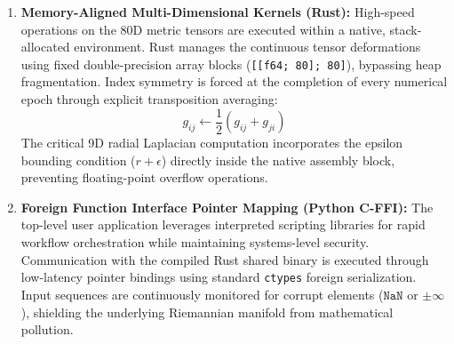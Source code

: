 \begin{enumerate}
    \item \textbf{Memory-Aligned Multi-Dimensional Kernels (Rust):} High-speed operations on the 80D metric tensors are executed within a native, stack-allocated environment. Rust manages the continuous tensor deformations using fixed double-precision array blocks (\texttt{[[f64; 80]; 80]}), bypassing heap fragmentation. Index symmetry is forced at the completion of every numerical epoch through explicit transposition averaging:
    \[
    g_{ij} \leftarrow \frac{1}{2}\left(g_{ij} + g_{ji}\right)
    \]
    The critical 9D radial Laplacian computation incorporates the epsilon bounding condition ($r + \epsilon$) directly inside the native assembly block, preventing floating-point overflow operations.
    
    \item \textbf{Foreign Function Interface Pointer Mapping (Python C-FFI):} The top-level user application leverages interpreted scripting libraries for rapid workflow orchestration while maintaining systems-level security. Communication with the compiled Rust shared binary is executed through low-latency pointer bindings using standard \texttt{ctypes} foreign serialization. Input sequences are continuously monitored for corrupt elements ($\mathtt{NaN}$ or $\pm\infty$), shielding the underlying Riemannian manifold from mathematical pollution.
\end{enumerate}
